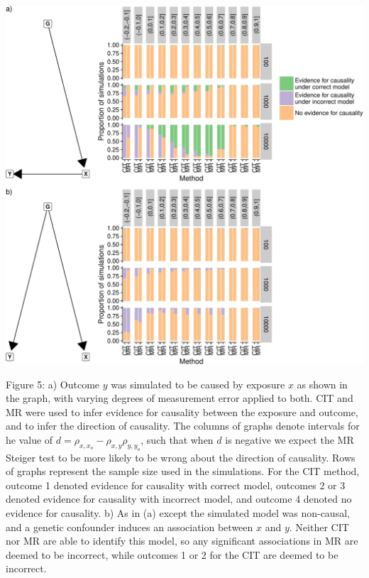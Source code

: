 \documentclass[]{article}
\begin{document}
\includegraphics{manuscript_files/figure-latex/cit_mr_comparison_figure-1.pdf}

Figure 5: a) Outcome \(y\) was simulated to be caused by exposure \(x\)
as shown in the graph, with varying degrees of measurement error applied
to both. CIT and MR were used to infer evidence for causality between
the exposure and outcome, and to infer the direction of causality. The
columns of graphs denote intervals for he value of
\(d = \rho_{x, x_o} - \rho_{x,y}\rho_{y,y_o}\), such that when \(d\) is
negative we expect the MR Steiger test to be more likely to be wrong
about the direction of causality. Rows of graphs represent the sample
size used in the simulations. For the CIT method, outcome 1 denoted
evidence for causality with correct model, outcomes 2 or 3 denoted
evidence for causality with incorrect model, and outcome 4 denoted no
evidence for causality. b) As in (a) except the simulated model was
non-causal, and a genetic confounder induces an association between
\(x\) and \(y\). Neither CIT nor MR are able to identify this model, so
any significant associations in MR are deemed to be incorrect, while
outcomes 1 or 2 for the CIT are deemed to be incorrect.

\newpage
\end{document}
